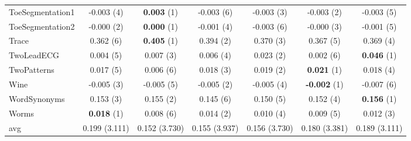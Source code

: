 \begin{table}[ht]
\begin{adjustbox}{width=\textwidth}
\begin{tabular}{lcccccc}
ToeSegmentation1 & -0.003 (4) & \textbf{0.003} (1) & -0.003 (6) & -0.003 (3) & -0.003 (2) & -0.003 (5) \\
ToeSegmentation2 & -0.000 (2) & \textbf{0.000} (1) & -0.001 (4) & -0.003 (6) & -0.000 (3) & -0.001 (5) \\
Trace & 0.362 (6) & \textbf{0.405} (1) & 0.394 (2) & 0.370 (3) & 0.367 (5) & 0.369 (4) \\
TwoLeadECG & 0.004 (5) & 0.007 (3) & 0.006 (4) & 0.023 (2) & 0.002 (6) & \textbf{0.046} (1) \\
TwoPatterns & 0.017 (5) & 0.006 (6) & 0.018 (3) & 0.019 (2) & \textbf{0.021} (1) & 0.018 (4) \\
Wine & -0.005 (3) & -0.005 (5) & -0.005 (2) & -0.005 (4) & \textbf{-0.002} (1) & -0.007 (6) \\
WordSynonyms & 0.153 (3) & 0.155 (2) & 0.145 (6) & 0.150 (5) & 0.152 (4) & \textbf{0.156} (1) \\
Worms & \textbf{0.018} (1) & 0.008 (6) & 0.014 (2) & 0.010 (4) & 0.009 (5) & 0.012 (3) \\
\hline 
avg & 0.199 (3.111) & 0.152 (3.730) & 0.155 (3.937) & 0.156 (3.730) & 0.180 (3.381) & 0.189 (3.111) \\ 
\hline
\end{tabular}
\end{adjustbox}
\end{table}

